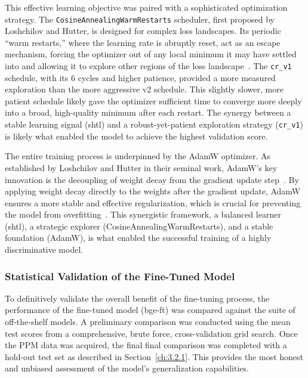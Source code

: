 This effective learning objective was paired with a sophisticated optimization strategy. The \verb|CosineAnnealingWarmRestarts| scheduler, first proposed by Loshchilov and Hutter, is designed for complex loss landscapes. Its periodic ``warm restarts,'' where the learning rate is abruptly reset, act as an escape mechanism, forcing the optimizer out of any local minimum it may have settled into and allowing it to explore other regions of the loss landscape~\cite{loshchilovhutter}. The \verb|cr_v1| schedule, with its 6 cycles and higher patience, provided a more measured exploration than the more aggressive v2 schedule. This slightly slower, more patient schedule likely gave the optimizer sufficient time to converge more deeply into a broad, high-quality minimum after each restart. The synergy between a stable learning signal (shtl) and a robust-yet-patient exploration strategy (\verb|cr_v1|) is likely what enabled the model to achieve the highest validation score.

The entire training process is underpinned by the AdamW optimizer. As established by Loshchilov and Hutter in their seminal work, AdamW's key innovation is the decoupling of weight decay from the gradient update step~\cite{loshchilov2019decoupledweightdecayregularization}. By applying weight decay directly to the weights after the gradient update, AdamW ensures a more stable and effective regularization, which is crucial for preventing the model from overfitting~\cite{loshchilov2019decoupledweightdecayregularization}. This synergistic framework, a balanced learner (shtl), a strategic explorer (CosineAnnealingWarmRestarts), and a stable foundation (AdamW), is what enabled the successful training of a highly discriminative model.

\subsubsection{Statistical Validation of the Fine-Tuned Model}
To definitively validate the overall benefit of the fine-tuning process, the performance of the fine-tuned model (bge-ft) was compared against the suite of off-the-shelf models. A preliminary comparison was conducted using the mean test scores from a comprehensive, brute force, cross-validation grid search.  Once the PPM data was acquired, the final final comparison was completed with a hold-out test set as described in Section~\ref{ch:3.2.1}.  This provides the most honest and unbiased assessment of the model's generalization capabilities.

